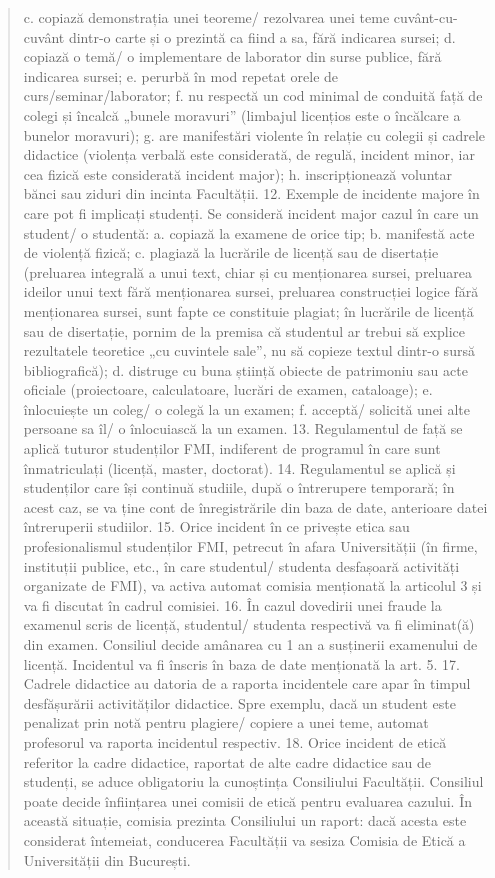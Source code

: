 \documentclass[paper=a4, fontsize=11pt]{scrartcl} %
\numberwithin{equation}{section} %
\numberwithin{figure}{section} %
\numberwithin{table}{section} %
\begin{document}
\begin{quote}
c. copiază demonstrația unei teoreme/ rezolvarea unei teme cuvânt-cu-cuvânt dintr-o
carte și o prezintă ca fiind a sa, fără indicarea sursei;
d. copiază o temă/ o implementare de laborator din surse publice, fără indicarea sursei;
e. perurbă în mod repetat orele de curs/seminar/laborator;
f. nu respectă un cod minimal de conduită față de colegi și încalcă „bunele moravuri”
(limbajul licențios este o încălcare a bunelor moravuri);
g. are manifestări violente în relație cu colegii și cadrele didactice (violența verbală este
considerată, de regulă, incident minor, iar cea fizică este considerată incident major);
h. inscripționează voluntar bănci sau ziduri din incinta Facultății.
12. Exemple de incidente majore în care pot fi implicați studenți.
Se consideră incident major cazul în care un student/ o studentă:
a. copiază la examene de orice tip;
b. manifestă acte de violență fizică;
c. plagiază la lucrările de licență sau de disertație (preluarea integrală a unui text, chiar
și cu menționarea sursei, preluarea ideilor unui text fără menționarea sursei,
preluarea construcției logice fără menționarea sursei, sunt fapte ce constituie plagiat;
în lucrările de licență sau de disertație, pornim de la premisa că studentul ar trebui să
explice rezultatele teoretice „cu cuvintele sale”, nu să copieze textul dintr-o sursă
bibliografică);
d. distruge cu buna știință obiecte de patrimoniu sau acte oficiale (proiectoare,
calculatoare, lucrări de examen, cataloage);
e. înlocuiește un coleg/ o colegă la un examen;
f. acceptă/ solicită unei alte persoane sa îl/ o înlocuiască la un examen.
13. Regulamentul de față se aplică tuturor studenților FMI, indiferent de programul în
care sunt înmatriculați (licență, master, doctorat).
14. Regulamentul se aplică și studenților care își continuă studiile, după o întrerupere
temporară; în acest caz, se va ține cont de înregistrările din baza de date, anterioare
datei întreruperii studiilor.
15. Orice incident în ce privește etica sau profesionalismul studenților FMI, petrecut în
afara Universității (în firme, instituții publice, etc., în care studentul/ studenta
desfașoară activități organizate de FMI), va activa automat comisia menționată la
articolul 3 și va fi discutat în cadrul comisiei.
16. În cazul dovedirii unei fraude la examenul scris de licență, studentul/ studenta
respectivă va fi eliminat(ă) din examen. Consiliul decide amânarea cu 1 an a
susținerii examenului de licență. Incidentul va fi înscris în baza de date menționată la
art. 5.
17. Cadrele didactice au datoria de a raporta incidentele care apar în timpul desfășurării
activităților didactice. Spre exemplu, dacă un student este penalizat prin notă pentru
plagiere/ copiere a unei teme, automat profesorul va raporta incidentul respectiv.
18. Orice incident de etică referitor la cadre didactice, raportat de alte cadre didactice
sau de studenți, se aduce obligatoriu la cunoștința Consiliului Facultății. Consiliul
poate decide înființarea unei comisii de etică pentru evaluarea cazului. În această
situație, comisia prezinta Consiliului un raport: dacă acesta este considerat întemeiat,
conducerea Facultății va sesiza Comisia de Etică a Universității din București. 

\end{quote}
\end{document}
